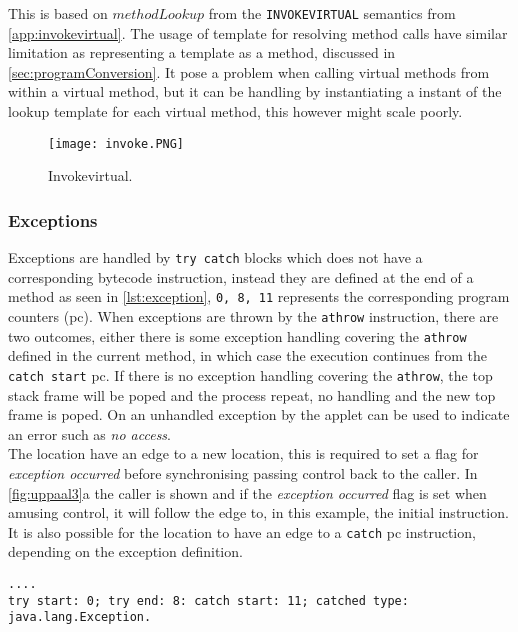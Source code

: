 This is based on $methodLookup$ from the \texttt{INVOKEVIRTUAL} semantics from \cref{app:invokevirtual}. The usage of template for resolving method calls have similar limitation as representing a template as a method, discussed in \cref{sec:programConversion}. It pose a problem when calling virtual methods from within a virtual method, but it can be handling by instantiating a instant of the lookup template for each virtual method, this however might scale poorly.

 
\begin{figure}[H]
\centering
\texttt{[image: invoke.PNG]}
\caption{Invokevirtual.}
\label{fig:invokevirtual}
\end{figure}

\subsubsection{Exceptions}
\label{sec:exceptions}
Exceptions are handled by \texttt{try catch} blocks which does not have a corresponding bytecode instruction, instead they are defined at the end of a method as seen in \cref{lst:exception}, \texttt{0, 8, 11} represents the corresponding program counters (pc).
When exceptions are thrown by the \texttt{athrow} instruction, there are two outcomes, either there is some exception handling covering the \texttt{athrow} defined in the current method, in which case the execution continues from the \texttt{catch start} pc. 
If there is no exception handling covering the \texttt{athrow}, the top stack frame will be poped and the process repeat, no handling and the new top frame is poped. On \jc an unhandled exception by the applet can be used to indicate an error such as \textit{no access}.\\

\noindent The  location have an edge to a new location, this is required to set a flag for \textit{exception occurred} before synchronising passing control back to the caller. In \cref{fig:uppaal3}a the caller is shown and if the \textit{exception occurred} flag is set when amusing control, it will follow the edge to, in this example, the initial instruction. It is also possible for the  location to have an edge to a \texttt{catch} pc instruction, depending on the exception definition.




\begin{lstlisting}[caption={Invokespecial Bytecode generated by Sawja.},numbers=none,label={lst:exception}]
....
try start: 0; try end: 8: catch start: 11; catched type: java.lang.Exception.
\end{lstlisting}





